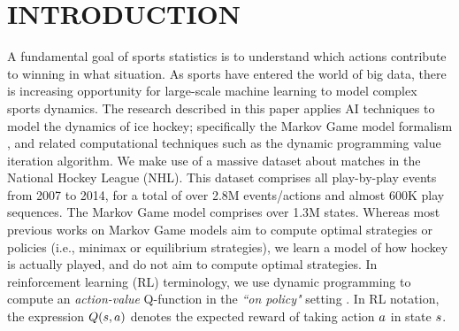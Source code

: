 \documentclass[]{article}
\begin{document}




\section{INTRODUCTION}

A fundamental goal of sports statistics is to understand which actions contribute to winning in what situation. As sports have entered the world of big data, there is increasing opportunity for large-scale machine learning to model complex sports dynamics. The research described in this paper applies AI techniques to model the dynamics of ice  hockey; specifically the Markov Game model formalism \citep{Littman1994}, and related computational techniques such as the dynamic programming value iteration algorithm. We make use of a massive dataset about matches in the National  Hockey League (NHL). This dataset comprises all play-by-play events from 2007 to 2014, for a total of over 2.8M events/actions and almost 600K play sequences.
The Markov Game model comprises over 1.3M states. Whereas most previous works on Markov Game models aim to compute optimal strategies or policies \citep{Littman1994} (i.e., minimax or equilibrium strategies), we learn a model of how hockey is actually played, and do not aim to compute optimal strategies. In reinforcement learning (RL) terminology, we use dynamic programming to compute an {\em action-value} Q-function in the {\em ``on policy"} setting \citep{bib:sutton}. In RL notation, the expression $Q(s,a)$ denotes the expected reward of taking action $a$ in state $s$.
\end{document}
